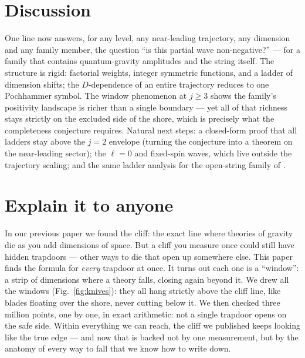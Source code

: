 \documentclass[11pt]{article}
\begin{document}
\section{Discussion}
One line now answers, for any level, any near-leading trajectory, any
dimension and any family member, the question ``is this partial wave
non-negative?'' --- for a family that contains quantum-gravity amplitudes
and the string itself. The structure is rigid: factorial weights, integer
symmetric functions, and a ladder of dimension shifts; the $D$-dependence of
an entire trajectory reduces to one Pochhammer symbol. The window phenomenon
at $j\ge3$ shows the family's positivity landscape is richer than a single
boundary --- yet all of that richness stays strictly on the excluded side of
the shore, which is precisely what the completeness conjecture requires.
Natural next steps: a closed-form proof that all ladders stay above the
$j{=}2$ envelope (turning the conjecture into a theorem on the near-leading
sector); the $\ell=0$ and fixed-spin waves, which live outside the
trajectory scaling; and the same ladder analysis for the open-string family
of \cite{island}.

\section*{Explain it to anyone}
In our previous paper we found the cliff: the exact line where theories of
gravity die as you add dimensions of space. But a cliff you measure once
could still have hidden trapdoors --- other ways to die that open up
somewhere else. This paper finds the formula for \emph{every} trapdoor at
once. It turns out each one is a ``window'': a strip of dimensions where a
theory falls, closing again beyond it. We drew all the windows
(Fig.~\ref{fig:knives}): they all hang strictly above the cliff line, like
blades floating over the shore, never cutting below it. We then checked
three million points, one by one, in exact arithmetic: not a single
trapdoor opens on the safe side. Within everything we can reach, the cliff we published keeps looking like
the true edge --- and now that is backed not by one measurement, but by the
anatomy of every way to fall that we know how to write down.
\end{document}
